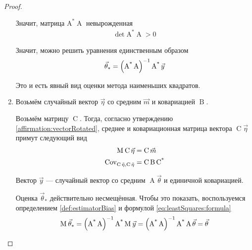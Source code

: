 \begin{proof}
\begin{enumerate}
            Значит, матрица $\operatorname{A^*} \operatorname{A}$ невырожденная
            \begin{align*}
                \det{\operatorname{A^*} \operatorname{A}} > 0
            \end{align*}

            Значит, можно решить уравнения единственным образом
            \begin{equation}\label{eq:leastSquares:formula}
                \index{оценка!метода наименьших квадратов!формула}
                \vec{\theta}_*
                = \left( \operatorname{A^*} \operatorname{A} \right)^{-1}
                    \operatorname{A^*} \vec{y}
            \end{equation}

            Это и есть явный вид оценки метода наименьших квадратов.

        \item Возьмём случайный вектор $\vec{\eta}$ со средним $\vec{m}$
            и ковариацией $\operatorname{B}$.
            
            Возьмём матрицу $\operatorname{C}$. Тогда, согласно утверждению
            \ref{affirmation:vectorRotated}, среднее и ковариационная матрица
            вектора $\operatorname{C}\vec{\eta}$ примут следующий вид
            \begin{align*}
                \operatorname{M}_{} \operatorname{C}\vec{\eta}
                    &= \operatorname{C} \vec{m}\\
                \operatorname{Cov^{}_{\operatorname{C} \vec{\eta}, \operatorname{C} \vec{\eta}}}
                    &= \operatorname{C} \operatorname{B} \operatorname{C^*}
            \end{align*}

            Вектор $\vec{y}$ --- случайный вектор со средним
            $\operatorname{A} \vec{\theta}$ и единичной ковариацией.

            Оценка $\vec{\theta}_*$ действительно несмещённая. Чтобы это
            показать, воспользуемся определением \ref{def:estimatorBias}
            и формулой \ref{eq:leastSquares:formula}
            \begin{align*}
                \operatorname{M}_{} \vec{\theta}_*
                = \left( \operatorname{A^*} \operatorname{A} \right)^{-1}
                    \operatorname{A^*} \operatorname{M}_{} \vec{y}
                = \left( \operatorname{A^*} \operatorname{A} \right)^{-1}
                    \operatorname{A^*} \operatorname{A} \vec{\theta}
                = \vec{\theta}
            \end{align*}


\end{enumerate}
\end{proof}
